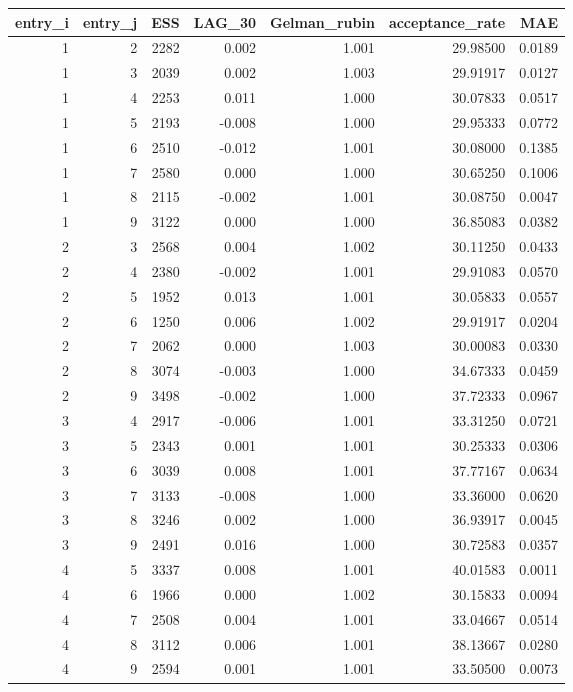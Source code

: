 \begin{longtable}{rrrrrrr}
\toprule
entry\_i & entry\_j & ESS & LAG\_30 & Gelman\_rubin & acceptance\_rate & MAE \\ 
\midrule
1 & 2 & 2282 & 0.002 & 1.001 & 29.98500 & 0.0189 \\ 
1 & 3 & 2039 & 0.002 & 1.003 & 29.91917 & 0.0127 \\ 
1 & 4 & 2253 & 0.011 & 1.000 & 30.07833 & 0.0517 \\ 
1 & 5 & 2193 & -0.008 & 1.000 & 29.95333 & 0.0772 \\ 
1 & 6 & 2510 & -0.012 & 1.001 & 30.08000 & 0.1385 \\ 
1 & 7 & 2580 & 0.000 & 1.000 & 30.65250 & 0.1006 \\ 
1 & 8 & 2115 & -0.002 & 1.001 & 30.08750 & 0.0047 \\ 
1 & 9 & 3122 & 0.000 & 1.000 & 36.85083 & 0.0382 \\ 
2 & 3 & 2568 & 0.004 & 1.002 & 30.11250 & 0.0433 \\ 
2 & 4 & 2380 & -0.002 & 1.001 & 29.91083 & 0.0570 \\ 
2 & 5 & 1952 & 0.013 & 1.001 & 30.05833 & 0.0557 \\ 
2 & 6 & 1250 & 0.006 & 1.002 & 29.91917 & 0.0204 \\ 
2 & 7 & 2062 & 0.000 & 1.003 & 30.00083 & 0.0330 \\ 
2 & 8 & 3074 & -0.003 & 1.000 & 34.67333 & 0.0459 \\ 
2 & 9 & 3498 & -0.002 & 1.000 & 37.72333 & 0.0967 \\ 
3 & 4 & 2917 & -0.006 & 1.001 & 33.31250 & 0.0721 \\ 
3 & 5 & 2343 & 0.001 & 1.001 & 30.25333 & 0.0306 \\ 
3 & 6 & 3039 & 0.008 & 1.001 & 37.77167 & 0.0634 \\ 
3 & 7 & 3133 & -0.008 & 1.000 & 33.36000 & 0.0620 \\ 
3 & 8 & 3246 & 0.002 & 1.000 & 36.93917 & 0.0045 \\ 
3 & 9 & 2491 & 0.016 & 1.000 & 30.72583 & 0.0357 \\ 
4 & 5 & 3337 & 0.008 & 1.001 & 40.01583 & 0.0011 \\ 
4 & 6 & 1966 & 0.000 & 1.002 & 30.15833 & 0.0094 \\ 
4 & 7 & 2508 & 0.004 & 1.001 & 33.04667 & 0.0514 \\ 
4 & 8 & 3112 & 0.006 & 1.001 & 38.13667 & 0.0280 \\ 
4 & 9 & 2594 & 0.001 & 1.001 & 33.50500 & 0.0073 \\ 

\end{longtable}
